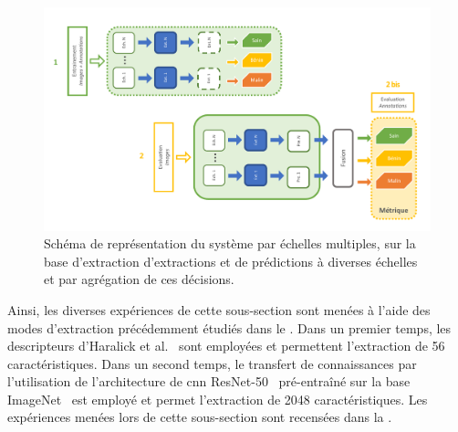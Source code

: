 \begin{figure}[H]
    \centering
    \includegraphics[width=0.85\linewidth]{contents/chapter_6/resources/scheme_image_improvement_multiscale_decision.pdf}
    \caption{Schéma de représentation du système par échelles multiples, sur la base d'extraction d'extractions et de prédictions à diverses échelles et par agrégation de ces décisions.}
    \label{fig:scheme_image_improvement_multiscale_decision}
\end{figure}\par

Ainsi, les diverses expériences de cette sous-section sont menées à l'aide des modes d'extraction précédemment étudiés dans le . Dans un premier temps, les descripteurs d'Haralick et al.~\cite{Haralick1973} sont employées et permettent l'extraction de 56 caractéristiques. Dans un second temps, le transfert de connaissances par l'utilisation de l'architecture de \gls{cnn} ResNet-50~\cite{He2016} pré-entraîné sur la base ImageNet~\cite{Canziani2016} est employé et permet l'extraction de 2048 caractéristiques. Les expériences menées lors de cette sous-section sont recensées dans la .\par

